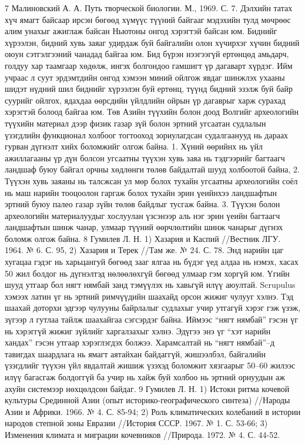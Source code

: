 7 Малиновский А. А. Путь творческой биологии. М., 1969. С. 7.
Дэлхийн татах хүч ямагт байсаар ирсэн бөгөөд хүмүүс түүний байгааг мэдэхийн тулд мөчрөөс алим унахыг ажиглаж байсан Ньютоны онгод хэрэгтэй байсан юм. Биднийг хүрээлэн, бидний хувь заяаг удирдаж буй байгалийн олон хүчирхэг хүчин бидний оюун сэтгэлгээний чанадад байгаа юм. Бид бүрэн нээгээгүй ертөнцөд амьдарч, голдуу хар таамгаар хөдөлж, ингэх болгондоо гамшигт үр дагаварт хүрдэг. Ийм учраас л суут эрдэмтдийн онгод хэмээн миний ойлгож явдаг шинжлэх ухааны шидэт нүдний шил биднийг хүрээлэн буй ертөнц, түүнд бидний эзэлж буй байр суурийг ойлгох, ядахдаа өөрсдийн үйлдлийн ойрын үр дагаврыг харж сурахад хэрэгтэй болоод байгаа юм.
Төв Азийн түүхийн болон доод Волгийг археологийн түүхийн материал дээр физик газар зүй болон эртний угсаатан судлалын үзэгдлийн функционал холбоог тогтооход зориулагдсан судалгаанууд нь дараах гурван дүгнэлт хийх боломжийг олгож байна. 1. Хүний өөрийнх нь үйл ажиллагааны үр дүн болсон угсаатны түүхэн хувь заяа нь тэдгээрийг багтаагч ландшаф буюу байгал орчны хөдлөнги төлөв байдалтай шууд холбоотой байна, 2. Түүхэн хувь заяаны нь талсжсан ул мөр болох тухайн угсаатны археологийн соёл нь маш нарийн тооцоолон гаргаж болох тухайн эрин үеийнхээ ландшафтын эртний буюу палео газар зүйн төлөв байдлыг тусгаж байна. 3. Түүхэн болон археологийн материалуудыг хослуулан үзсэнээр аль нэг эрин үеийн багтаагч ландшафтын шинж чанар, улмаар түүний өөрчлөлтийн шинж чанарыг дүгнэх боломж олгож байна.
8 Гумилев Л. Н. 1) Хазария и Каспий //Вестник ЛГУ. 1964. № 6. С. 95, 2) Хазария и Терек //Там же. № 24. С. 78.
Энд нарийн цаг хугацаа гэдэг нь харьцангуй бөгөөд зааг ялгаа нь бүдэг үед алдаа нь нэмэх, хасах 50 жил болдог нь дүгнэлтэд нөлөөлөхгүй бөгөөд улмаар гэм хоргүй юм. Үгийн шууд утгаар бол нягт нямбай занд тэмүүлэх нь хавьгүй илүү аюултай. Scrupulus хэмээх латин үг нь эртний римчүүдийн шаахайд орсон жижиг чулууг хэлнэ. Тэд шаахай доторхи эдгээр чулууны байрлалыг судлахыг учир утгагүй хэрэг гэж үзэж, зүгээр л гутлаа тайлж шаахайгаа сэгсэрдэг байна. Иймээс “нягт нямбай” гэсэн үг нь хэрэггүй жижиг зүйлийг харгалзахыг хэлнэ. Эдүгээ энэ үг “хэт нарийн хандах” гэсэн утгаар хэрэглэгдэх болжээ.
Харамсалтай нь “нягт нямбай”–д тавигдах шаардлага нь ямагт аятайхан байдаггүй, жишээлбэл, байгалийн үзэгдлийг түүхэн үйл явдалтай жишиж үзэхэд боломжит хязгаарыг 50–60 жилээс илүү багасгаж болдоггүй ба учир нь хайж буй холбоо нь эртний орнуудын аж ахуйн системээр нөхцөлдсөн байдаг.
9 Гумилев Л. Н. 1) Истоки ритма кочевой культуры Срединной Азии (опыт историко-географического синтеза) //Народы Азии и Африки. 1966. № 4. С. 85-94; 2) Роль климатических колебаний в истории народов степной зоны Евразии //История СССР. 1967. № 1. С. 53-66; 3) Изменения климата и миграции кочевников //Природа. 1972. № 4. С. 44-52.
